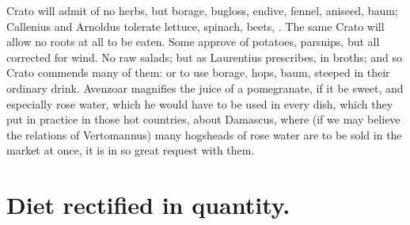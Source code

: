 {Crato will admit of no herbs, but borage, bugloss, endive,
fennel, aniseed, baum; Callenius and Arnoldus tolerate lettuce,
spinach, beets, \etc{}. The same Crato will allow no roots at all to be
eaten. Some approve of potatoes, parsnips, but all corrected for wind.
No raw salads; but as Laurentius prescribes, in broths; and so Crato
commends many of them: or to use borage, hops, baum, steeped in their
ordinary drink. Avenzoar magnifies the juice of a pomegranate, if
it be sweet, and especially rose water, which he would have to be used
in every dish, which they put in practice in those hot countries, about
Damascus, where (if we may believe the relations of Vertomannus) many
hogsheads of rose water are to be sold in the market at once, it is in
so great request with them.

\section{Diet rectified in quantity.}

}
